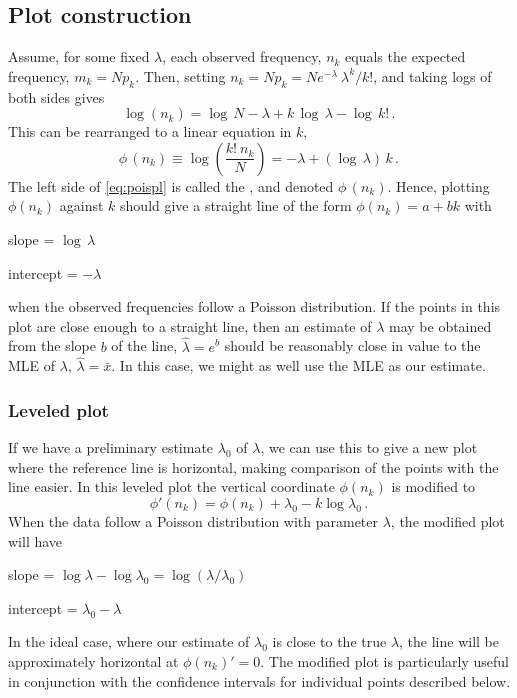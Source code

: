 \documentclass[11pt]{book}\usepackage[]{graphicx}\usepackage[]{color}
\begin{document}
\subsection{Plot construction}
Assume, for some fixed \(\lambda\), each observed frequency, \(n_k\)
equals the expected frequency, \(m_k = N p_k\).  Then, setting
\(n_k = N p_k  = N { e^{ - \lambda } \:  \lambda^k } /  { k ! }\),
and taking logs of both sides gives
\begin{equation*}
  \log ( n_k ) = \log \,  N - \lambda  +  k \,  \log \,  \lambda  -
  \log \,  k !
  \period
\end{equation*}
This can be rearranged to a linear equation in $k$,
\begin{equation} \label{eq:poispl}
  \phi \,  ( n_k ) \equiv \log \left(  \frac{ k ! \:  n_k } {N} \right)
 = - \lambda  +  ( \log \,  \lambda ) \,  k
 \period
\end{equation}
The left side of \eqref{eq:poispl} is called the , and
denoted \(\phi \,  ( n_k )\).  Hence,
plotting \(\phi ( n_k )\) against \(k\) should give a straight line of the form
\(\phi ( n_k )= a + b k\) with
\begin{itemize*}
\item slope = \(\log  \,  \lambda\)
\item intercept = \(- \lambda\)
\end{itemize*}
when the observed frequencies follow a Poisson distribution.
If the points in this plot are close enough to a straight line,
then an estimate of $\lambda$ may be obtained from the slope $b$ of the line,
$\hat{\lambda} = e^b$ should be reasonably close in value
to the MLE of $\lambda$, $\hat{\lambda} = \bar{x}$.
In this case, we might as well use the MLE as our estimate.

\subsubsection{Leveled plot}
If we have a preliminary estimate $\lambda_0$ of $\lambda$,
we can use this to give a new plot where the reference line
is horizontal, making comparison of the points with the line
easier.
In this leveled plot the vertical coordinate $\phi (n_k)$ is modified to
\begin{equation}\label{eq:pois-leveled}
 \phi ' (n_k) = \phi (n_k) + \lambda_0 - k \log \lambda_0
 \period
\end{equation}
When the data follow a Poisson distribution with parameter
$\lambda$, the modified plot will have
\begin{itemize*}
\item slope = \(\log  \lambda - \log  \lambda_0 = \log ( \lambda / \lambda_0 ) \)
\item intercept = \(\lambda_0 - \lambda\)
\end{itemize*}
In the ideal case, where our estimate of $\lambda_0$ is close to the true
$\lambda$, the line will be approximately
horizontal at $\phi(n_k) ' = 0$.
The modified plot is particularly useful in conjunction with the
confidence intervals for individual points described below.
\end{document}
